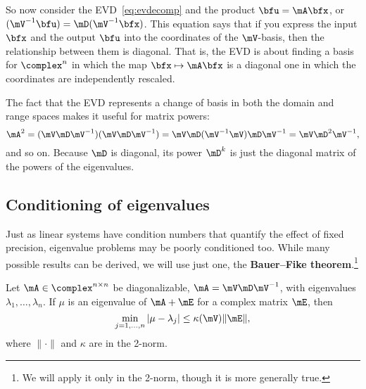 So now consider the EVD~\eqref{eq:evdecomp} and the product $\bfu =\mA \bfx$, or $(\mV^{-1}\bfu) = \mD(\mV^{-1}\bfx)$. This equation says that if you express the input $\bfx$ and the output $\bfu$ into the coordinates of the $\mV$-basis, then the relationship between them
is diagonal. That is, the EVD is about finding a basis for $\complex^n$ in which the map $\bfx\mapsto\mA\bfx$ is a diagonal one in which the coordinates are independently rescaled.

The fact that the EVD represents a change of basis in both the domain and range spaces makes it useful for matrix powers: $$\mA^2=(\mV\mD\mV^{-1})(\mV\mD\mV^{-1})=\mV\mD(\mV^{-1}\mV)\mD\mV^{-1}=\mV\mD^2\mV^{-1},$$ and so on. Because $\mD$ is diagonal, its power $\mD^k$ is just the diagonal matrix of the powers of the eigenvalues.


\subsection{Conditioning of eigenvalues}
\label{sec:schur}

Just as linear systems have condition numbers that quantify the effect of fixed precision, eigenvalue problems may be poorly conditioned too. While many possible results can be derived, we will use just one, the  \textbf{Bauer--Fike theorem}.\footnote{We will apply it only in the 2-norm, though it is more generally true.}  \begin{thm}
  \label{thm:bauerfike}
  Let $\mA\in\complex^{n\times n}$ be diagonalizable, $\mA=\mV\mD\mV^{-1}$, with
  eigenvalues $\lambda_1,\ldots,\lambda_n$. If $\mu$ is an eigenvalue
  of $\mA+\mE$ for a complex matrix $\mE$, then
  \begin{equation}
    \label{eq:bauerfike}
    \min_{j=1,\ldots,n} |\mu - \lambda_j| \le \kappa(\mV) \| \mE \|,
  \end{equation}
  where $\|\cdot\|$ and $\kappa$ are in the 2-norm.
\end{thm}

